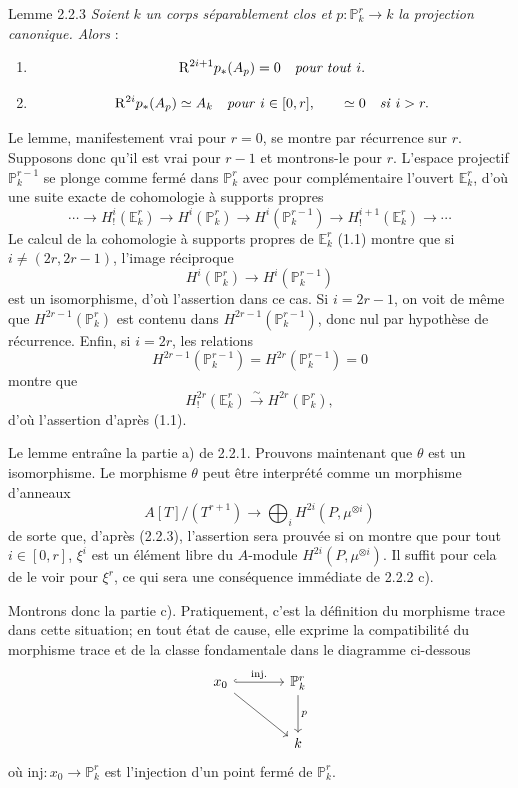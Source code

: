 \begin{statement}{Lemme 2.2.3}
\emph{Soient} $k$ \emph{un corps séparablement clos et} $p:\mathbb{P}_k^r\to k$ \emph{la projection canonique. Alors} :
\begin{enumerate}[label=\alph*)]
\item
\[
\mathrm{R}^{2i+1}p_*(A_p)=0\quad\text{\emph{pour tout} }i.
\]
\item
\[
\mathrm{R}^{2i}p_*(A_p)\simeq A_k\quad\text{\emph{pour} }i\in[0,r],
\qquad
\simeq 0\quad\text{\emph{si} }i>r.
\]
\end{enumerate}
\end{statement}

Le lemme, manifestement vrai pour $r=0$, se montre par récurrence sur $r$. Supposons donc qu'il est vrai pour $r-1$ et montrons-le pour $r$. L'espace projectif $\mathbb{P}_k^{r-1}$ se plonge comme fermé dans $\mathbb{P}_k^r$ avec pour complémentaire l'ouvert $\mathbb{E}_k^r$, d'où une suite exacte de cohomologie à supports propres
\[
\cdots\longrightarrow H_!^i(\mathbb{E}_k^r)\longrightarrow H^i(\mathbb{P}_k^r)
\longrightarrow H^i(\mathbb{P}_k^{r-1})\longrightarrow H_!^{i+1}(\mathbb{E}_k^r)\longrightarrow\cdots
\]
Le calcul de la cohomologie à supports propres de $\mathbb{E}_k^r$ (1.1) montre que si $i\ne(2r,2r-1)$, l'image réciproque
\[
H^i(\mathbb{P}_k^r)\longrightarrow H^i(\mathbb{P}_k^{r-1})
\]
est un isomorphisme, d'où l'assertion dans ce cas. Si $i=2r-1$, on voit de même que $H^{2r-1}(\mathbb{P}_k^r)$ est contenu dans $H^{2r-1}(\mathbb{P}_k^{r-1})$, donc nul par hypothèse de récurrence. Enfin, si $i=2r$, les relations
\[
H^{2r-1}(\mathbb{P}_k^{r-1})=H^{2r}(\mathbb{P}_k^{r-1})=0
\]
montre que
\[
H_!^{2r}(\mathbb{E}_k^r)\xrightarrow{\sim}H^{2r}(\mathbb{P}_k^r),
\]
d'où l'assertion d'après (1.1).

Le lemme entraîne la partie a) de 2.2.1. Prouvons maintenant que $\theta$ est un isomorphisme. Le morphisme $\theta$ peut être interprété comme un morphisme d'anneaux
\[
A[T]/(T^{r+1})\longrightarrow\bigoplus_i H^{2i}(P,\mu^{\otimes i})
\]
de
sorte que, d'après (2.2.3), l'assertion sera prouvée si on montre que pour tout $i\in[0,r]$, $\xi^i$ est un élément libre du $A$-module $H^{2i}(P,\mu^{\otimes i})$. Il suffit pour cela de le voir pour $\xi^r$, ce qui sera une conséquence immédiate de 2.2.2 c).

Montrons donc la partie c). Pratiquement, c'est la définition du morphisme trace dans cette situation; en tout état de cause, elle exprime la compatibilité du morphisme trace et de la classe fondamentale dans le diagramme ci-dessous
\[
\begin{tikzcd}[column sep=large,row sep=large]
x_0 \arrow[r,hook,"\mathrm{inj.}"] \arrow[dr] & \mathbb{P}^r_k \arrow[d,"p"]\\
& k
\end{tikzcd}
\]
où $\mathrm{inj}:x_0\to \mathbb{P}^r_k$ est l'injection d'un point fermé de $\mathbb{P}^r_k$.

